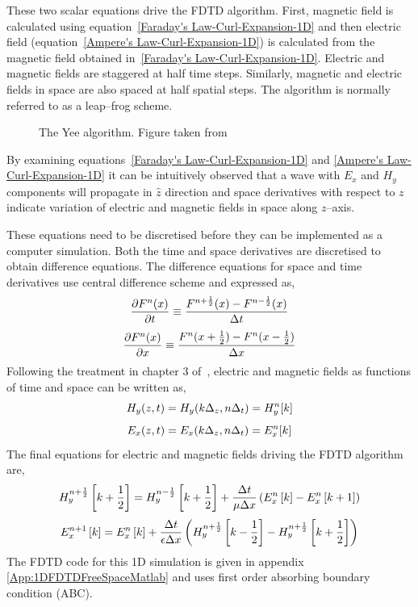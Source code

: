 These two scalar equations drive the FDTD algorithm. First, magnetic field is calculated using equation~\ref{Faraday's Law-Curl-Expansion-1D} and then electric field (equation~\ref{Ampere's Law-Curl-Expansion-1D}) is calculated from the magnetic field obtained in~\ref{Faraday's Law-Curl-Expansion-1D}. Electric and magnetic fields are staggered at half time steps. Similarly, magnetic and electric fields in space are also spaced at half spatial steps. The algorithm is normally referred to as a leap--frog scheme.
\begin{figure}[here]
\centering
\caption{The Yee algorithm. Figure taken from~\cite{JBSchneiderUFDTD}}
\label{Algorithm}
\end{figure}
By examining equations~\ref{Faraday's Law-Curl-Expansion-1D} and \ref{Ampere's Law-Curl-Expansion-1D} it can be intuitively observed that a wave with $E_x$ and $H_y$ components will propagate in $\hat{z}$ direction and space derivatives with respect to $z$ indicate variation of electric and magnetic fields in space along $z$--axis.

These equations need to be discretised before they can be implemented as a computer simulation. Both the time and space derivatives are discretised to obtain difference equations. The difference equations for space and time derivatives use central difference scheme and expressed as,
\begin{equation}
\centering
\dfrac{\partial F^n(x)}{\partial t} \equiv \dfrac{F^{n+\frac{1}{2}}(x)-F^{n-\frac{1}{2}}(x)}{\Delta t}
\label{central-difference-time}
\end{equation}
\begin{equation}
\centering
\dfrac{\partial F^n(x)}{\partial x} \equiv \dfrac{F^n(x+\frac{1}{2})-F^n(x-\frac{1}{2})}{\Delta x}
\label{central-difference-space}
\end{equation}
Following the treatment in chapter 3 of~\cite{JBSchneiderUFDTD}, electric and magnetic fields as functions of time and space can be written as,
\begin{equation}
\centering
H_y (z,t)=H_y (k\Delta _z,n\Delta _t)=H^n_y[k]
\label{Hy-of-z_and_t}
\end{equation}
\begin{equation}
\centering
E_x (z,t)=E_x (k\Delta _z,n\Delta _t)=E^n_x[k]
\label{Ex-of-z_and_t}
\end{equation}
The final equations for electric and magnetic fields driving the FDTD algorithm are,
\begin{equation}
\centering
H^{n+\frac{1}{2}}_y \left[k+\frac{1}{2}\right]=H^{n-\frac{1}{2}}_y \left[k+\frac{1}{2}\right] + \dfrac{\Delta t}{\mu \Delta x} \left( E^{n}_x \left[k\right] - E^{n}_x \left[k+1\right] \right)
\label{Hy-1D-Simple-FDTD-Driver}
\end{equation}
\begin{equation}
\centering
E^{n+1}_x \left[k\right]=E^{n}_x \left[k\right] + \dfrac{\Delta t}{\epsilon \Delta x} \left( H^{n+\frac{1}{2}}_y \left[k-\frac{1}{2}\right] - H^{n+\frac{1}{2}}_y \left[k+\frac{1}{2}\right] \right)
\label{Ex-1D-Simple-FDTD-Driver}
\end{equation}
The FDTD code for this 1D simulation is given in appendix \ref{App:1DFDTDFreeSpaceMatlab} and uses first order absorbing boundary condition (ABC).
